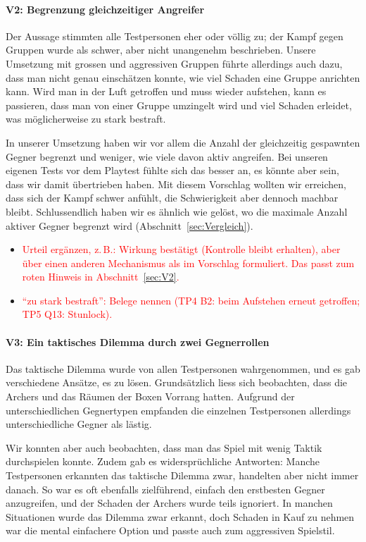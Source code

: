 \documentclass[../Main.tex]{subfiles}
\begin{document}
\paragraph{V2: Begrenzung gleichzeitiger Angreifer}
Der Aussage stimmten alle Testpersonen eher oder völlig zu; der Kampf gegen Gruppen wurde als schwer, aber nicht unangenehm beschrieben. Unsere Umsetzung mit grossen und aggressiven Gruppen führte allerdings auch dazu, dass man nicht genau einschätzen konnte, wie viel Schaden eine Gruppe anrichten kann. Wird man in der Luft getroffen und muss wieder aufstehen, kann es passieren, dass man von einer Gruppe umzingelt wird und viel Schaden erleidet, was möglicherweise zu stark bestraft.

In unserer Umsetzung haben wir vor allem die Anzahl der gleichzeitig gespawnten Gegner begrenzt und weniger, wie viele davon aktiv angreifen. Bei unseren eigenen Tests vor dem Playtest fühlte sich das besser an, es könnte aber sein, dass wir damit übertrieben haben. Mit diesem Vorschlag wollten wir erreichen, dass sich der Kampf schwer anfühlt, die Schwierigkeit aber dennoch machbar bleibt. Schlussendlich haben wir es ähnlich wie  gelöst, wo die maximale Anzahl aktiver Gegner begrenzt wird (Abschnitt~\ref{sec:Vergleich}).

\begin{itemize}[leftmargin=1.5cm]
    \item \textcolor{red}{Urteil ergänzen, z.\,B.: Wirkung bestätigt (Kontrolle bleibt erhalten), aber über einen anderen Mechanismus als im Vorschlag formuliert. Das passt zum roten Hinweis in Abschnitt~\ref{sec:V2}.}
    \item \textcolor{red}{\enquote{zu stark bestraft}: Belege nennen (TP4 B2: beim Aufstehen erneut getroffen; TP5 Q13: Stunlock).}
\end{itemize}

\paragraph{V3: Ein taktisches Dilemma durch zwei Gegnerrollen}
Das taktische Dilemma wurde von allen Testpersonen wahrgenommen, und es gab verschiedene Ansätze, es zu lösen. Grundsätzlich liess sich beobachten, dass die Archers und das Räumen der Boxen Vorrang hatten. Aufgrund der unterschiedlichen Gegnertypen empfanden die einzelnen Testpersonen allerdings unterschiedliche Gegner als lästig.

Wir konnten aber auch beobachten, dass man das Spiel mit wenig Taktik durchspielen konnte. Zudem gab es widersprüchliche Antworten: Manche Testpersonen erkannten das taktische Dilemma zwar, handelten aber nicht immer danach. So war es oft ebenfalls zielführend, einfach den erstbesten Gegner anzugreifen, und der Schaden der Archers wurde teils ignoriert. In manchen Situationen wurde das Dilemma zwar erkannt, doch Schaden in Kauf zu nehmen war die mental einfachere Option und passte auch zum aggressiven Spielstil.
\end{document}

